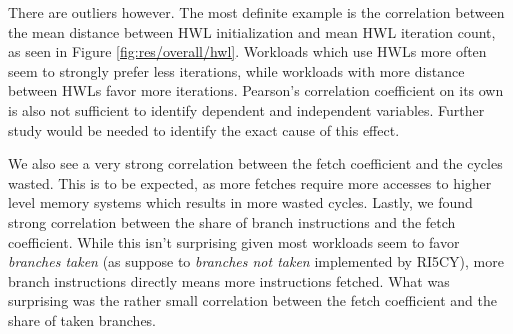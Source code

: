 \documentclass[../bachelor_paper.tex]{subfiles}
\begin{document}
There are outliers however. The most definite example is the correlation between the mean distance between \ac{HWL} initialization and mean \ac{HWL} iteration count, as seen in Figure \ref{fig:res/overall/hwl}. Workloads which use \acp{HWL} more often seem to strongly prefer less iterations, while workloads with more distance between \acp{HWL} favor more iterations. Pearson's correlation coefficient on its own is also not sufficient to identify dependent and independent variables. Further study would be needed to identify the exact cause of this effect. 

We also see a very strong correlation between the fetch coefficient and the cycles wasted. This is to be expected, as more fetches require more accesses to higher level memory systems which results in more wasted cycles. Lastly, we found strong correlation between the share of branch instructions and the fetch coefficient. While this isn't surprising given most workloads seem to favor \emph{branches taken} (as suppose to \emph{branches not taken} implemented by RI5CY), more branch instructions directly means more instructions fetched. What was surprising was the rather small correlation between the fetch coefficient and the share of taken branches.
\end{document}
